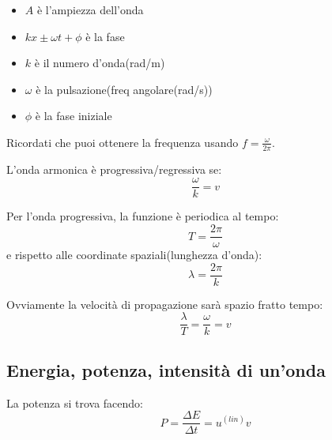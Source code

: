 \begin{itemize}
    \item $A$ è l'ampiezza dell'onda
    \item $kx \pm \omega t + \phi$ è la fase
    \item $k$ è il numero d'onda(rad/m)
    \item $\omega$ è la pulsazione(freq angolare(rad/s))
    \item $\phi$ è la fase iniziale
\end{itemize}

Ricordati che puoi ottenere la frequenza usando $f = \frac{\omega}{2\pi}$.

L'onda armonica è progressiva/regressiva se:
\begin{equation}
    \frac{\omega}{k} = v
\end{equation}

Per l'onda progressiva, la funzione è periodica al tempo:
\begin{equation}
    T = \frac{2\pi}{\omega}
\end{equation}
e rispetto alle coordinate spaziali(lunghezza d'onda):
\begin{equation}
    \lambda = \frac{2\pi}{k}
\end{equation}

Ovviamente la velocità di propagazione sarà spazio fratto tempo:
\begin{equation}
    \frac{\lambda}{T} = \frac{\omega}{k} = v
\end{equation}

\subsection{Energia, potenza, intensità di un'onda}

La potenza si trova facendo:
\begin{equation}
    P = \frac{\Delta E}{\Delta t} = u^{(lin)}v
\end{equation}

